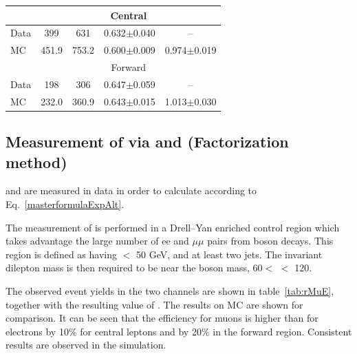 \begin{table}[hbt]
\begin{tabular}{l|c|c|c|c}
    \hline
    & \multicolumn{4}{c}{Central} \\
    \hline
    Data & 399 & 631 & 0.632$\pm$0.040 & -- \\
    MC & 451.9 & 753.2 & 0.600$\pm$0.009 & 0.974$\pm$0.019\\
    \hline 
    & \multicolumn{4}{c}{Forward} \\
    \hline
    Data & 198 & 306 & 0.647$\pm$0.059 & -- \\
    MC & 232.0 & 360.9 & 0.643$\pm$0.015 & 1.013$\pm$0.030\\
  \end{tabular}  
\end{table}

\subsection{Measurement of \rsfof via \rmue and \rt (Factorization method)}
\label{ssec:rsfoffactorization}
\rmue and \rt are measured in data in order to calculate \rsfof according to Eq.~\ref{masterformulaExpAlt}.

The measurement of \rmue is performed in a Drell--Yan enriched control region
which takes advantage the large number of ee and $\mu\mu$ pairs from \Z boson decays.
This region is defined as having \MET $<$ 50 GeV, and at least two jets.
The invariant dilepton mass is then required to be near the \Z boson mass,
60\GeV $<$ \mll $<$ 120\GeV.

The observed event yields in the two channels are shown in table~\ref{tab:rMuE},
together with the resulting value of \rmue.
The results on MC are shown for comparison.
It can be seen that the efficiency for muons is higher than for electrons by 10\%
for central leptons and by 20\% in the forward region.
Consistent results are observed in the simulation.

